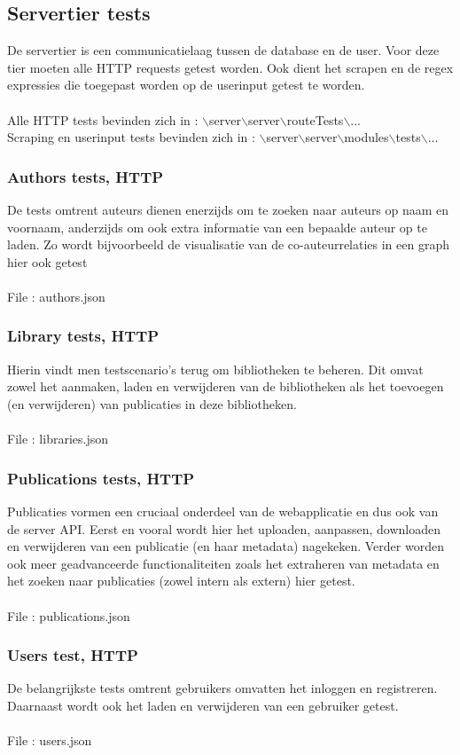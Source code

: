 \documentclass{article}
\begin{document}
\subsection{Servertier tests}
De servertier is een communicatielaag tussen de database en de user. Voor deze tier moeten alle HTTP requests getest worden. Ook dient het scrapen en de regex expressies die toegepast worden op de userinput getest te worden. 
\\\\
Alle HTTP tests bevinden zich in : $\backslash$server$\backslash$server$\backslash$routeTests$\backslash$...\\
Scraping en userinput tests bevinden zich in : $\backslash$server$\backslash$server$\backslash$modules$\backslash$tests$\backslash$...
\subsubsection{Authors tests, HTTP}
De tests omtrent auteurs dienen enerzijds om te zoeken naar auteurs op naam en voornaam, anderzijds om ook extra informatie van een bepaalde auteur op te laden. Zo wordt bijvoorbeeld de visualisatie van de co-auteurrelaties in een graph hier ook getest\\\\
File : authors.json
\subsubsection{Library tests, HTTP}
Hierin vindt men testscenario's terug om bibliotheken te beheren. Dit omvat zowel het aanmaken, laden en verwijderen van de bibliotheken als het toevoegen (en verwijderen) van publicaties in deze bibliotheken.\\\\
File : libraries.json
\subsubsection{Publications tests, HTTP}
Publicaties vormen een cruciaal onderdeel van de webapplicatie en dus ook van de server API. Eerst en vooral wordt hier het uploaden, aanpassen, downloaden en verwijderen van een publicatie (en haar metadata) nagekeken. Verder worden ook meer geadvanceerde functionaliteiten zoals het extraheren van metadata en het zoeken naar publicaties (zowel intern als extern) hier getest.\\\\
File : publications.json
\subsubsection{Users test, HTTP}
De belangrijkste tests omtrent gebruikers omvatten het inloggen en registreren.
Daarnaast wordt ook het laden en verwijderen van een gebruiker getest.\\\\
File : users.json
\end{document}
